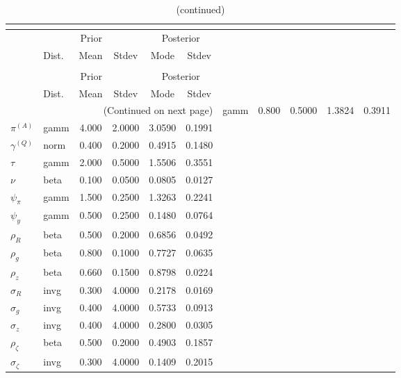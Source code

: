 
\begin{center}
\begin{longtable}{llcccc} 
\caption{Results from posterior maximization (parameters)}\\
 \label{Table:Posterior:1}\\
\toprule 
  & \multicolumn{3}{c}{Prior}  &  \multicolumn{2}{c}{Posterior} \\
  \cmidrule(r{.75em}){2-4} \cmidrule(r{.75em}){5-6}
  & Dist. & Mean  & Stdev & Mode & Stdev \\ 
\midrule \endfirsthead 
\caption{(continued)}\\
 \bottomrule 
  & \multicolumn{3}{c}{Prior}  &  \multicolumn{2}{c}{Posterior} \\
  \cmidrule(r{.75em}){2-4} \cmidrule(r{.75em}){5-6}
  & Dist. & Mean  & Stdev & Mode & Stdev \\ 
\midrule \endhead 
\bottomrule \multicolumn{6}{r}{(Continued on next page)}\endfoot 
\bottomrule\endlastfoot 
${r_{A}}$ & gamm &   0.800 & 0.5000 &   1.3824 &  0.3911 \\ 
${\pi^{(A)}}$ & gamm &   4.000 & 2.0000 &   3.0590 &  0.1991 \\ 
${\gamma^{(Q)}}$ & norm &   0.400 & 0.2000 &   0.4915 &  0.1480 \\ 
${\tau}$ & gamm &   2.000 & 0.5000 &   1.5506 &  0.3551 \\ 
${\nu}$ & beta &   0.100 & 0.0500 &   0.0805 &  0.0127 \\ 
${\psi_\pi}$ & gamm &   1.500 & 0.2500 &   1.3263 &  0.2241 \\ 
${\psi_y}$ & gamm &   0.500 & 0.2500 &   0.1480 &  0.0764 \\ 
${\rho_R}$ & beta &   0.500 & 0.2000 &   0.6856 &  0.0492 \\ 
${\rho_{g}}$ & beta &   0.800 & 0.1000 &   0.7727 &  0.0635 \\ 
${\rho_z}$ & beta &   0.660 & 0.1500 &   0.8798 &  0.0224 \\ 
${\sigma_R}$ & invg &   0.300 & 4.0000 &   0.2178 &  0.0169 \\ 
${\sigma_{g}}$ & invg &   0.400 & 4.0000 &   0.5733 &  0.0913 \\ 
${\sigma_z}$ & invg &   0.400 & 4.0000 &   0.2800 &  0.0305 \\ 
${\rho_\zeta}$ & beta &   0.500 & 0.2000 &   0.4903 &  0.1857 \\ 
${\sigma_\zeta}$ & invg &   0.300 & 4.0000 &   0.1409 &  0.2015 \\ 
\end{longtable}
 \end{center}
